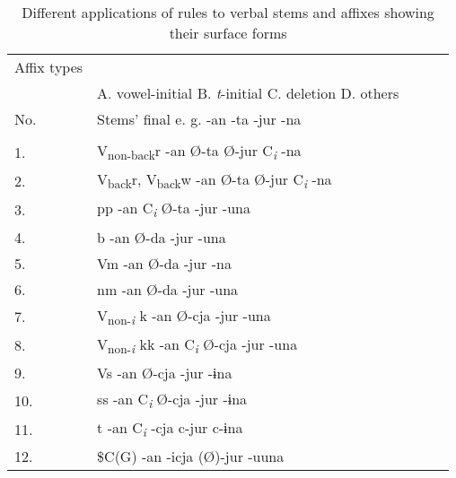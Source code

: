 \begin{table}
\caption{\label{tab:key:58}Different applications of rules to verbal stems and affixes showing their surface forms}
\begin{tabular}{l llll}
\lsptoprule
    Affix types    \\
  &  A. vowel-initial  B. \textit{t}-initial  C. deletion  D. others\\
No. &  Stems’ final  e. g.  -an  -ta  -jur  -na                                                                              \\
\midrule                                                                                                                   \\
1. &V\textsubscript{non-back}r    -an  Ø-ta  Ø-jur  C\textit{\textsubscript{i}} -na                                        \\
2. &V\textsubscript{back}r, V\textsubscript{back}w    -an  Ø-ta  Ø-jur  C\textit{\textsubscript{i}} -na                    \\
3. &pp    -an  C\textit{\textsubscript{i}} Ø-ta  -jur  -una                                                                \\
4. &b    -an  Ø-da  -jur  -una                                                                                             \\
5. &Vm    -an  Ø-da  -jur  -na                                                                                             \\
6. &nm    -an  Ø-da  -jur  -una                                                                                            \\
7. &V\textsubscript{non-}\textit{\textsubscript{i}} k    -an  Ø-cja  -jur  -una                                            \\
8. &V\textsubscript{non-}\textit{\textsubscript{i}} kk    -an  C\textit{\textsubscript{i}} Ø-cja  -jur  -una               \\
9. &Vs    -an  Ø-cja  -jur  -ɨna                                                                                           \\
10.& ss    -an  C\textit{\textsubscript{i}} Ø-cja  -jur  -ɨna                                                              \\
11.& t    -an  C\textit{\textsubscript{i}} -cja  c-jur  c-ɨna                                                              \\
12.& \$C(G)    -an  -icja  (Ø)-jur  -uuna                                                                                  \\

\end{tabular}
\end{table}
